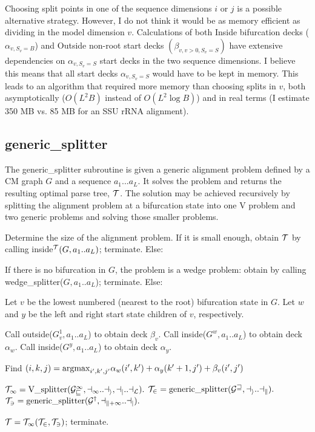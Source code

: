 \documentclass[11pt]{article}
\def\argmax{\mbox{\rm{argmax}}}      %
\begin{document}
Choosing split points in one of the sequence dimensions $i$ or $j$ is
a possible alternative strategy. However, I do not think it would be
as memory efficient as dividing in the model dimension
$v$. Calculations of both Inside bifurcation decks ($\alpha_{v,
S_v=B}$) and Outside non-root start decks $(\beta_{v, v > 0, S_v =
S})$ have extensive dependencies on $\alpha_{v,S_v=S}$ start decks in
the two sequence dimensions.  I believe this means that all start
decks $\alpha_{v,S_v=S}$ would have to be kept in memory. This leads
to an algorithm that required more memory than choosing splits in $v$,
both asymptotically ($O(L^2B)$ instead of $O(L^2 \log B)$) and in real
terms (I estimate 350 MB vs. 85 MB for an SSU rRNA alignment).

\subsection{generic\_splitter}

The generic\_splitter subroutine is given a generic alignment problem
defined by a CM graph $G$ and a sequence $a_1...a_L$. It solves the
problem and returns the resulting optimal parse tree, $\cal{T}$. The
solution may be achieved recursively by splitting the alignment
problem at a bifurcation state into one V problem and two generic
problems and solving those smaller problems.

Determine the size of the alignment problem. If it is small enough,
obtain $\cal{T}$ by calling inside$^{\cal{T}}(G, a_1..a_L)$;
terminate.  Else:

If there is no bifurcation in $G$, the problem is a wedge problem:
obtain  by calling wedge\_splitter($G, a_1..a_L$); terminate.
Else:

Let $v$ be the lowest numbered (nearest to the root) bifurcation state
in $G$. Let $w$ and $y$ be the left and right start state children of
$v$, respectively.

Call outside($G^1_v, a_1..a_L$) to obtain deck $\beta_v$.
Call inside($G^w, a_1..a_L$)    to obtain deck $\alpha_w$.
Call inside($G^y, a_1..a_L$)    to obtain deck $\alpha_y$.

Find $(i,k,j) = \argmax_{i',k',j'} \alpha_w(i',k') + \alpha_y(k'+1,j') + \beta_v(i',j')$ 

$\cal{T}_1 = \mbox{V\_splitter}(G^1_v, a_1..a_i, a_j..a_L).$
$\cal{T}_2 = \mbox{generic\_splitter}(G^w, a_i..a_k).$
$\cal{T}_3 = \mbox{generic\_splitter}(G^y, a_{k+1}..a_j).$

$\cal{T} = \cal{T}_1 (\cal{T}_2, \cal{T}_3)$; terminate.
\end{document}
